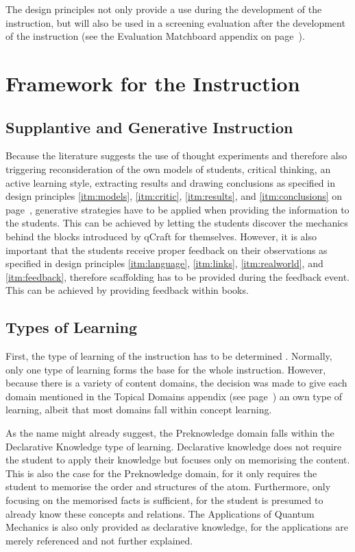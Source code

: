 \documentclass[11pt,twoside]{report} %
\begin{document}
The design principles not only provide a use during the development of the instruction, but will also be used in a screening evaluation after the development of the instruction \cite{evamatchboard} (see the Evaluation Matchboard appendix on page~\pageref{app:evamatchboard}).

\section{Framework for the Instruction}

\subsection{Supplantive and Generative Instruction}

Because the literature suggests the use of thought experiments and therefore also triggering reconsideration of the own models of students, critical thinking, an active learning style, extracting results and drawing conclusions as specified in design principles \ref{itm:models}, \ref{itm:critic}, \ref{itm:results}, and \ref{itm:conclusions} on page~\pageref{itm:models}, generative strategies have to be applied when providing the information to the students. This can be achieved by letting the students discover the mechanics behind the blocks introduced by qCraft for themselves. However, it is also important that the students receive proper feedback on their observations as specified in design principles \ref{itm:language}, \ref{itm:links}, \ref{itm:realworld}, and \ref{itm:feedback}, therefore scaffolding has to be provided during the feedback event. This can be achieved by providing feedback within books.

\subsection{Types of Learning}

First, the type of learning of the instruction has to be determined \cite{smithragan}. Normally, only one type of learning forms the base for the whole instruction. However, because there is a variety of content domains, the decision was made to give each domain mentioned in the Topical Domains appendix (see page~\pageref{app:topicaldomains}) an own type of learning, albeit that most domains fall within concept learning.

As the name might already suggest, the Preknowledge domain falls within the Declarative Knowledge type of learning. Declarative knowledge does not require the student to apply their knowledge but focuses only on memorising the content. This is also the case for the Preknowledge domain, for it only requires the student to memorise the order and structures of the atom. Furthermore, only focusing on the memorised facts is sufficient, for the student is presumed to already know these concepts and relations. The Applications of Quantum Mechanics is also only provided as declarative knowledge, for the applications are merely referenced and not further explained.
\end{document}
